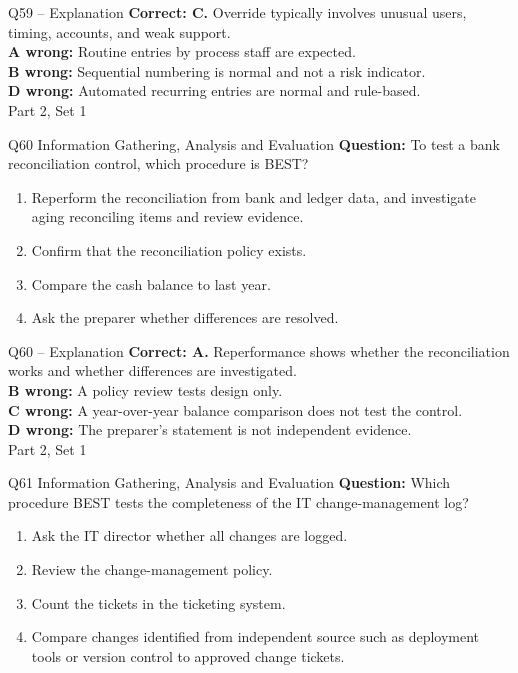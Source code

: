 \documentclass[aspectratio=169,10pt]{beamer}
\begin{document}
\begin{frame}[t]{Q59 -- Explanation}
	\footnotesize
	\textbf{Correct: C.} Override typically involves unusual users, timing, accounts, and weak support. \\[5pt]
\textbf{A wrong:} Routine entries by process staff are expected. \\[3pt]
\textbf{B wrong:} Sequential numbering is normal and not a risk indicator. \\[3pt]
\textbf{D wrong:} Automated recurring entries are normal and rule-based. \\[3pt]
	\vfill {\tiny Part 2, Set 1}
\end{frame}
\begin{frame}[t]{Q60 \hfill {\scriptsize Information Gathering, Analysis and Evaluation}}
	\small
	\textbf{Question:} To test a bank reconciliation control, which procedure is BEST?
	\begin{enumerate}[label=\Alph*.,itemsep=1pt,topsep=3pt]
			\item Reperform the reconciliation from bank and ledger data, and investigate aging reconciling items and review evidence.
			\item Confirm that the reconciliation policy exists.
			\item Compare the cash balance to last year.
			\item Ask the preparer whether differences are resolved.
	\end{enumerate}
\end{frame}
\begin{frame}[t]{Q60 -- Explanation}
	\footnotesize
	\textbf{Correct: A.} Reperformance shows whether the reconciliation works and whether differences are investigated. \\[5pt]
\textbf{B wrong:} A policy review tests design only. \\[3pt]
\textbf{C wrong:} A year-over-year balance comparison does not test the control. \\[3pt]
\textbf{D wrong:} The preparer's statement is not independent evidence. \\[3pt]
	\vfill {\tiny Part 2, Set 1}
\end{frame}
\begin{frame}[t]{Q61 \hfill {\scriptsize Information Gathering, Analysis and Evaluation}}
	\small
	\textbf{Question:} Which procedure BEST tests the completeness of the IT change-management log?
	\begin{enumerate}[label=\Alph*.,itemsep=1pt,topsep=3pt]
			\item Ask the IT director whether all changes are logged.
			\item Review the change-management policy.
			\item Count the tickets in the ticketing system.
			\item Compare changes identified from independent source such as deployment tools or version control to approved change tickets.
	\end{enumerate}
\end{frame}
\end{document}
